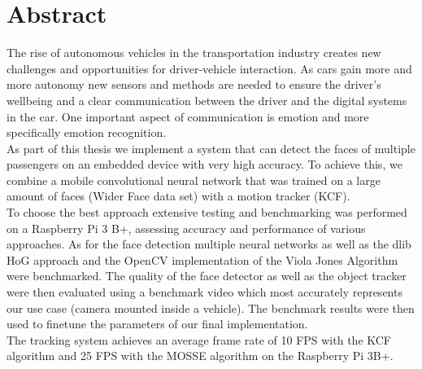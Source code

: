 \chapter{Abstract}
The rise of autonomous vehicles in the transportation industry creates new challenges and opportunities for driver-vehicle interaction. As cars gain more and more autonomy new sensors and methods are needed to ensure the driver's wellbeing and a clear communication between the driver and the digital systems in the car. One important aspect of communication is emotion and more specifically emotion recognition.\\
As part of this thesis we implement a system that can detect the faces of multiple passengers on an embedded device with very high accuracy. To achieve this, we combine a mobile convolutional neural network that was trained on a large amount of faces (Wider Face data set) with a motion tracker (KCF).\\
To choose the best approach extensive testing and benchmarking was performed on a Raspberry Pi 3 B+, assessing accuracy and performance of various approaches. As for the face detection multiple neural networks as well as the dlib HoG approach and the OpenCV implementation of the Viola Jones Algorithm were benchmarked. The quality of the face detector as well as the object tracker were then evaluated using a benchmark video which most accurately represents our use case (camera mounted inside a vehicle). The benchmark results were then used to finetune the parameters of our final implementation.\\
The tracking system achieves an average frame rate of 10 FPS with the KCF algorithm and 25 FPS with the MOSSE algorithm on the Raspberry Pi 3B+.